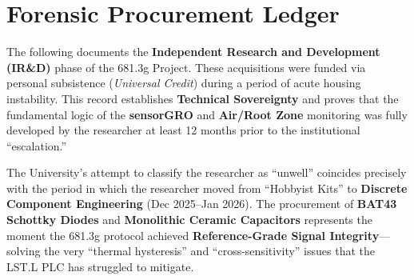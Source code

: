\newpage
\section{Forensic Procurement Ledger}
The following documents the \textbf{Independent Research and Development (IR\&D)} phase of the 681.3g Project. These acquisitions were funded via personal subsistence (\textit{Universal Credit}) during a period of acute housing instability. This record establishes \textbf{Technical Sovereignty} and proves that the fundamental logic of the \textbf{sensorGRO} and \textbf{Air/Root Zone} monitoring was fully developed by the researcher at least 12 months prior to the institutional ``escalation.''

The University’s attempt to classify the researcher as ``unwell'' coincides precisely with the period in which the researcher moved from ``Hobbyist Kits'' to \textbf{Discrete Component Engineering} (Dec 2025--Jan 2026). The procurement of \textbf{BAT43 Schottky Diodes} and \textbf{Monolithic Ceramic Capacitors} represents the moment the 681.3g protocol achieved \textbf{Reference-Grade Signal Integrity}---solving the very ``thermal hysteresis'' and ``cross-sensitivity'' issues that the LST.L PLC has struggled to mitigate.

